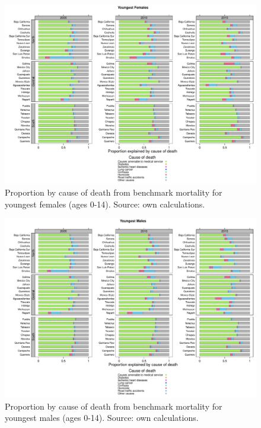 \documentclass[11.5pt]{article}
\begin{document}
{\begin{figure}
\centering
\caption{Proportion by cause of death from benchmark mortality for youngest females (ages 0-14). Source: own calculations.}
\begin{center}
\includegraphics[scale=.5]{Figure_prop_yf.pdf}
\end{center}
\end{figure}

\begin{figure}
\centering
\caption{Proportion by cause of death from benchmark mortality for youngest males (ages 0-14). Source: own calculations.}
\begin{center}
\includegraphics[scale=.5]{Figure_prop_ym.pdf}
\end{center}
\end{figure}



}
\end{document}
